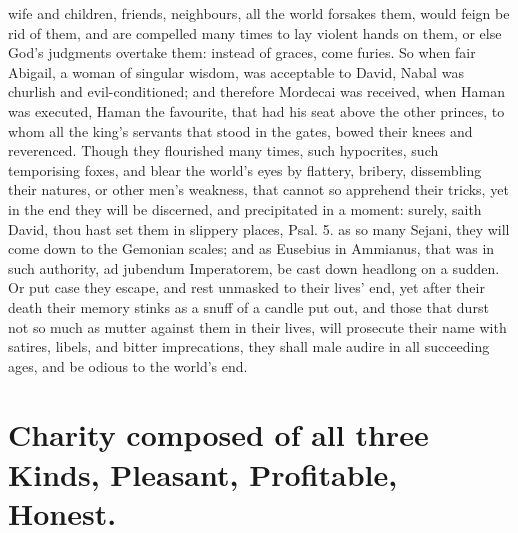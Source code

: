 {wife and children, friends, neighbours, all the world forsakes them,
would feign be rid of them, and are compelled many times to lay violent
hands on them, or else God's judgments overtake them: instead of
graces, come furies. So when fair Abigail, a woman of singular
wisdom, was acceptable to David, Nabal was churlish and
evil-conditioned; and therefore Mordecai was received, when Haman
was executed, Haman the favourite, that had his seat above the other
princes, to whom all the king's servants that stood in the gates, bowed
their knees and reverenced. Though they flourished many times, such
hypocrites, such temporising foxes, and blear the world's eyes by
flattery, bribery, dissembling their natures, or other men's weakness,
that cannot so apprehend their tricks, yet in the end they will be
discerned, and precipitated in a moment: surely, saith David, thou hast
set them in slippery places, Psal.  5. as so many Sejani, they
will come down to the Gemonian scales; and as Eusebius in 
Ammianus, that was in such authority, ad jubendum Imperatorem, be cast
down headlong on a sudden. Or put case they escape, and rest unmasked
to their lives' end, yet after their death their memory stinks as a
snuff of a candle put out, and those that durst not so much as mutter
against them in their lives, will prosecute their name with satires,
libels, and bitter imprecations, they shall male audire in all
succeeding ages, and be odious to the world's end.


\section[Charity]{Charity composed of all three Kinds, Pleasant, Profitable, Honest.}

}
